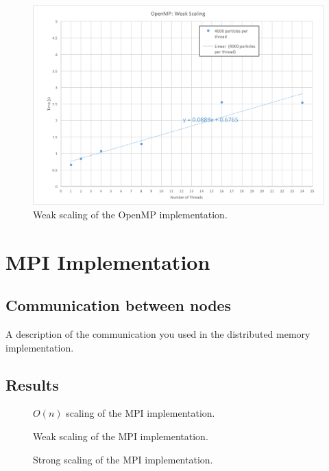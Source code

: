 \documentclass[12pt]{article}
\begin{document}
\begin{figure}
\includegraphics[width=\textwidth]{graphs/weak_scaling.png}
  \caption{Weak scaling of the OpenMP implementation.}
  \label{fig:openmp-weak}
\end{figure}

\section{MPI Implementation}

\subsection{Communication between nodes}
A description of the communication you used in the distributed memory implementation.

\subsection{Results}

\begin{figure}
  \caption{$O(n)$ scaling of the MPI implementation.}
  \label{fig:mpi-on}
\end{figure}

\begin{figure}
  \caption{Weak scaling of the MPI implementation.}
  \label{fig:mpi-weak}
\end{figure}

\begin{figure}
  \caption{Strong scaling of the MPI implementation.}
  \label{fig:mpi-strong}
\end{figure}
\end{document}
